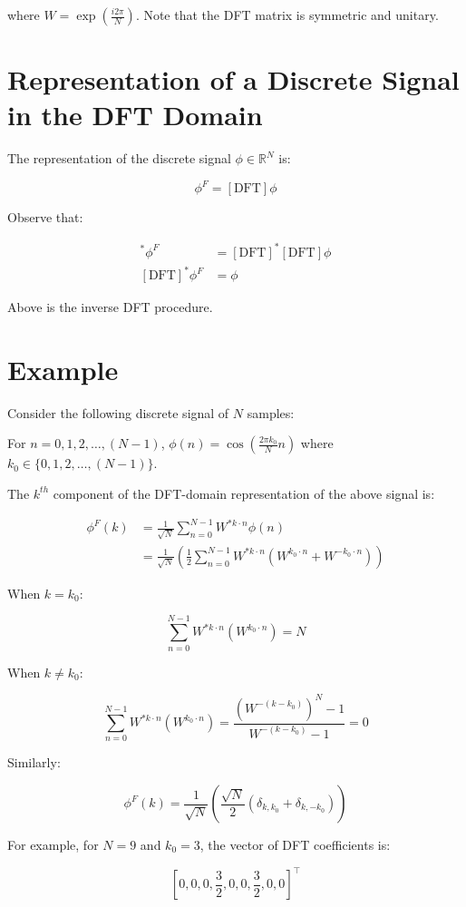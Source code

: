 \documentclass[12pt]{article}
\begin{document}
where $W = \exp\left(\frac{i2\pi}{N}\right)$. Note that the DFT matrix is symmetric and unitary.

\section{Representation of a Discrete Signal in the DFT Domain}

The representation of the discrete signal $\phi \in \mathbb{R}^N$ is:

\begin{equation}
\phi^F = [\text{DFT}] \phi
\end{equation}

Observe that:

\begin{align}
[\text{DFT}]^* \phi^F &= [\text{DFT}]^* [\text{DFT}] \phi \\
[\text{DFT}]^* \phi^F &= \phi
\end{align}

Above is the inverse DFT procedure.

\section{Example}

Consider the following discrete signal of $N$ samples:

For $n = 0, 1, 2, \ldots, (N-1)$, $\phi(n) = \cos\left(\frac{2\pi k_0}{N} n\right)$ where $k_0 \in \{0, 1, 2, \ldots, (N-1)\}$.

The $k^{th}$ component of the DFT-domain representation of the above signal is:

\begin{align}
\phi^F(k) &= \frac{1}{\sqrt{N}} \sum_{n=0}^{N-1} W^{*k \cdot n} \phi(n) \\
&= \frac{1}{\sqrt{N}} \left(\frac{1}{2} \sum_{n=0}^{N-1} W^{*k \cdot n} (W^{k_0 \cdot n} + W^{-k_0 \cdot n})\right)
\end{align}

When $k = k_0$:

\begin{equation}
\sum_{n=0}^{N-1} W^{*k \cdot n} (W^{k_0 \cdot n}) = N
\end{equation}

When $k \neq k_0$:

\begin{equation}
\sum_{n=0}^{N-1} W^{*k \cdot n} (W^{k_0 \cdot n}) = \frac{(W^{-(k-k_0)})^N - 1}{W^{-(k-k_0)} - 1} = 0
\end{equation}

Similarly:

\begin{equation}
\phi^F(k) = \frac{1}{\sqrt{N}} \left(\frac{\sqrt{N}}{2} (\delta_{k,k_0} + \delta_{k,-k_0})\right)
\end{equation}

For example, for $N = 9$ and $k_0 = 3$, the vector of DFT coefficients is:

\begin{equation}
\left[0, 0, 0, \frac{3}{2}, 0, 0, \frac{3}{2}, 0, 0\right]^\top
\end{equation}
\end{document}
